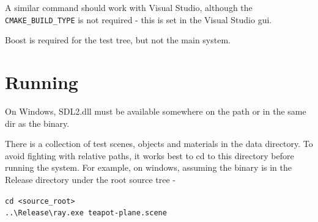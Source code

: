 A similar command should work with Visual Studio, although the \verb|CMAKE_BUILD_TYPE| is not required - this is set in the Visual Studio gui.

Boost is required for the test tree, but not the main system.

\section{Running}

On Windows, SDL2.dll must be available somewhere on the path or in the same dir as the binary. 

There is a collection of test scenes, objects and materials in the data directory. To avoid fighting with relative paths, it works best to cd to this directory before running the system. For example, on windows, assuming the binary is in the Release directory under the root source tree - 

\verb|cd <source_root>| \\
\verb|..\Release\ray.exe teapot-plane.scene|

